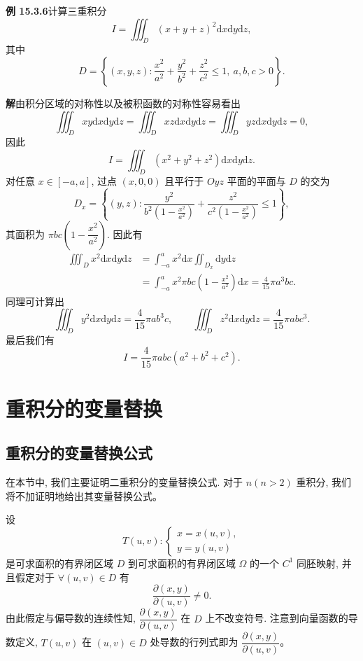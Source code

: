 \documentclass[UTF8, 12pt, fontset=fandol, oneside]{ctexart}
\begin{document}
\noindent\textbf{例 15.3.6}\quad 计算三重积分
\[
  I=\iiint_D (x+y+z)^2\mathrm dx\mathrm dy\mathrm dz,
\]
其中
\[
  D=\left\{(x,y,z):\frac{x^2}{a^2}+\frac{y^2}{b^2}+\frac{z^2}{c^2}\leqslant1,\ a,b,c>0\right\}.
\]

\noindent\textbf{解}\quad 由积分区域的对称性以及被积函数的对称性容易看出
\[
  \iiint_D xy\mathrm dx\mathrm dy\mathrm dz
  =\iiint_D xz\mathrm dx\mathrm dy\mathrm dz
  =\iiint_D yz\mathrm dx\mathrm dy\mathrm dz=0,
\]
因此
\[
  I=\iiint_D (x^2+y^2+z^2)\mathrm dx\mathrm dy\mathrm dz.
\]
对任意 $x\in[-a,a]$, 过点 $(x,0,0)$ 且平行于 $Oyz$ 平面的平面与 $D$ 的交为
\[
  D_x=\left\{(y,z):\frac{y^2}{b^2\left(1-\frac{x^2}{a^2}\right)}
  +\frac{z^2}{c^2\left(1-\frac{x^2}{a^2}\right)}\leqslant1\right\},
\]
其面积为 $\pi bc\left(1-\dfrac{x^2}{a^2}\right)$. 因此有
\[
\begin{aligned}
  \iiint_D x^2\mathrm dx\mathrm dy\mathrm dz
  &=\int_{-a}^a x^2\mathrm dx\iint_{D_x}\mathrm dy\mathrm dz\\
  &=\int_{-a}^a x^2\pi bc\left(1-\frac{x^2}{a^2}\right)\mathrm dx
    =\frac4{15}\pi a^3bc.
\end{aligned}
\]
同理可计算出
\[
  \iiint_D y^2\mathrm dx\mathrm dy\mathrm dz=\frac4{15}\pi ab^3c,\qquad
  \iiint_D z^2\mathrm dx\mathrm dy\mathrm dz=\frac4{15}\pi abc^3.
\]
最后我们有
\[
  I=\frac4{15}\pi abc(a^2+b^2+c^2).
\]

\section{重积分的变量替换}

\subsection{重积分的变量替换公式}

在本节中, 我们主要证明二重积分的变量替换公式. 对于 $n(n>2)$ 重积分, 我们将不加证明地给出其变量替换公式。

设
\[
  T(u,v):
  \begin{cases}
    x=x(u,v),\\
    y=y(u,v)
  \end{cases}
\]
是可求面积的有界闭区域 $D$ 到可求面积的有界闭区域 $\Omega$ 的一个 $C^1$ 同胚映射, 并且假定对于 $\forall(u,v)\in D$ 有
\[
  \frac{\partial(x,y)}{\partial(u,v)}\ne0.
\]
由此假定与偏导数的连续性知, $\dfrac{\partial(x,y)}{\partial(u,v)}$ 在 $D$ 上不改变符号. 注意到向量函数的导数定义, $T(u,v)$ 在 $(u,v)\in D$ 处导数的行列式即为 $\dfrac{\partial(x,y)}{\partial(u,v)}$。
\end{document}
